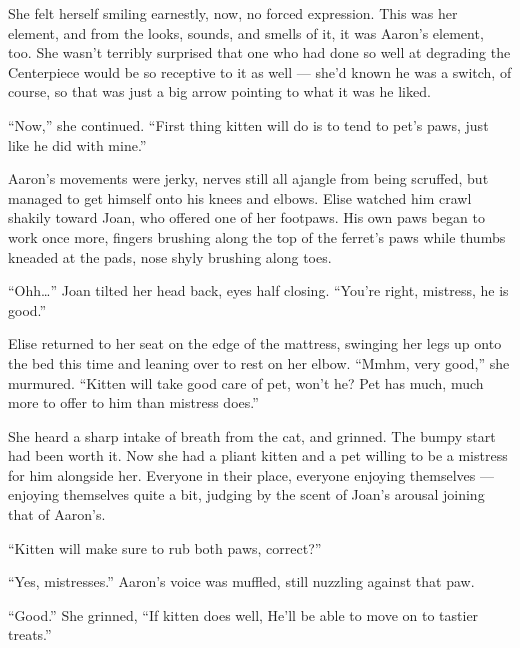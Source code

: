 She felt herself smiling earnestly, now, no forced expression. This was her element, and from the looks, sounds, and smells of it, it was Aaron's element, too. She wasn't terribly surprised that one who had done so well at degrading the Centerpiece would be so receptive to it as well --- she'd known he was a switch, of course, so that was just a big arrow pointing to what it was he liked.

``Now,'' she continued. ``First thing kitten will do is to tend to pet's paws, just like he did with mine.''

Aaron's movements were jerky, nerves still all ajangle from being scruffed, but managed to get himself onto his knees and elbows. Elise watched him crawl shakily toward Joan, who offered one of her footpaws. His own paws began to work once more, fingers brushing along the top of the ferret's paws while thumbs kneaded at the pads, nose shyly brushing along toes.

``Ohh\ldots{}'' Joan tilted her head back, eyes half closing. ``You're right, mistress, he is good.''

Elise returned to her seat on the edge of the mattress, swinging her legs up onto the bed this time and leaning over to rest on her elbow. ``Mmhm, very good,'' she murmured. ``Kitten will take good care of pet, won't he? Pet has much, much more to offer to him than mistress does.''

She heard a sharp intake of breath from the cat, and grinned. The bumpy start had been worth it. Now she had a pliant kitten and a pet willing to be a mistress for him alongside her. Everyone in their place, everyone enjoying themselves --- enjoying themselves quite a bit, judging by the scent of Joan's arousal joining that of Aaron's.

``Kitten will make sure to rub both paws, correct?''

``Yes, mistresses.'' Aaron's voice was muffled, still nuzzling against that paw.

``Good.'' She grinned, ``If kitten does well, He'll be able to move on to tastier treats.''
